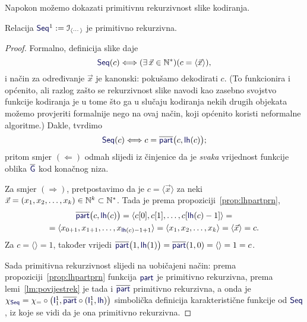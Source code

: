 Napokon možemo dokazati primitivnu rekurzivnost slike kodiranja.

\begin{korolar}[{name=[primitivna rekurzivnost slike kodiranja konačnih nizova]}]\label{kor:Seqprn}
    Relacija $\f{Seq}^1:=\im{\langle\cdots\rangle}$ je primitivno rekurzivna.
\end{korolar}
\begin{proof}
Formalno, definicija slike daje
\begin{equation}
    \f{Seq}(c)\Longleftrightarrow(\exists\,\vec x\in\N^*)(c=\langle\vec x\rangle)\text,
\end{equation}
i način za određivanje $\vec x$ je kanonski: pokušamo dekodirati $c$. (To funkcionira i općenito, ali razlog zašto se rekurzivnost slike navodi kao zasebno svojstvo funkcije kodiranja je u tome što ga u slučaju kodiranja nekih drugih objekata možemo provjeriti formalnije nego na ovaj način, koji općenito koristi neformalne algoritme.) Dakle, tvrdimo
\begin{equation}
    \f{Seq}(c)\Longleftrightarrow c\eq\overline{\f{part}}\bigl(c,\f{lh}(c)\bigr)\text;
\end{equation}
pritom smjer $(\Leftarrow)$ odmah slijedi iz činjenice da je \emph{svaka} vrijednost funkcije oblika $\overline{\f G}$ kod konačnog niza.

    Za smjer $(\Rightarrow)$, pretpostavimo da je $c=\langle\vec x\rangle$ za neki $\vec x=(x_1,x_2,\dotsc,x_k)\in{\mathbb N}^k\subset{\mathbb N}^*$. Tada je prema propoziciji~\ref{prop:lhpartprn},
\begin{multline}
    \overline{\f{part}}\bigl(c,\f{lh}(c)\bigr)=\langle c[0],c[1],\dotsc,c[\f{lh}(c)-1]\rangle=\\
    =\langle x_{0+1},x_{1+1},\dotsc,x_{\f{lh}(c)-1+1}\rangle=\langle x_1,x_2,\dotsc,x_k\rangle=\langle\vec x\rangle=c\text.
\end{multline}
Za $c=\langle\rangle=1$, također vrijedi $\overline{\f{part}}\bigl(1,\f{lh}(1)\bigr)=\overline{\f{part}}(1,0)=\langle\rangle=1=c$.

Sada primitivna rekurzivnost slijedi na uobičajeni način: prema propoziciji~\ref{prop:lhpartprn} funkcija $\f{part}$ je primitivno rekurzivna, prema lemi~\ref{lm:povijestrek} je tada i $\overline{\f{part}}$ primitivno rekurzivna, a onda je $\chi_{\f{Seq}}=\chi_\eq\circ\bigl(\f I_1^1,\overline{\f{part}}\circ(\f I_1^1,\f{lh})\bigr)$ simbolička definicija karakteristične funkcije od $\f{Seq}$, iz koje se vidi da je ona primitivno rekurzivna.
\end{proof}

